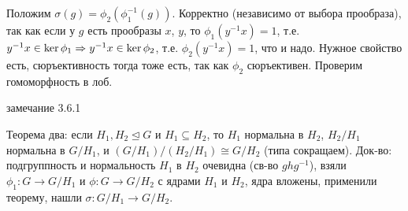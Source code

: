 Положим $\sigma(g) = \phi_2(\phi_1^{-1}(g))$.
Корректно (независимо от выбора прообраза), так как если у $g$ есть прообразы $x$, $y$,
то $\phi_1(y^{-1}x)=1$, т.е. $y^{-1}x \in \ker \phi_1 \Rightarrow y^{-1}x \in \ker \phi_2$,
т.е. $\phi_2(y^{-1}x)=1$, что и надо.
Нужное свойство есть, сюръективность тогда тоже есть, так как $\phi_2$ сюръективен.
Проверим гомоморфность в лоб.

\TODO замечание 3.6.1

Теорема два: если $H_1, H_2 \unlhd G$ и $H_1 \subseteq H_2$, то	$H_1$ нормальна в $H_2$,
$H_2 / H_1$ нормальна в $G/H_1$, и $(G/H_1)/(H_2/H_1)\cong G/H_2$ (типа сокращаем).
Док-во: подгруппность и нормальность $H_1$ в $H_2$ очевидна (св-во $ghg^{-1}$),
взяли $\phi_1 \colon G \to G/H_1$ и $\phi \colon G \to G/H_2$ с ядрами $H_1$ и $H_2$,
ядра вложены, применили теорему, нашли $\sigma \colon G/H_1 \to G/H_2$.
\TODO
